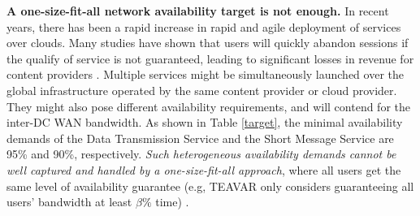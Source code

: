 \documentclass[sigconf]{acmart}
\begin{document}
\textbf{A one-size-fit-all network availability target is not enough.}
In recent years, there has been a rapid increase in rapid and agile deployment of services over clouds.
Many studies have shown that users will quickly abandon sessions if the qualify of service is not guaranteed, leading to significant losses in revenue for content providers \cite{video1,video2,video3}.
Multiple services might be simultaneously launched over the global infrastructure operated by the same content provider or cloud provider. 
They might also pose different availability requirements, and  will contend for the  
inter-DC WAN bandwidth.
As shown in  Table \ref{target}, the minimal availability demands of the Data Transmission Service \cite{alibaba2} and the Short Message Service\cite{alibaba3} are 95\% and 90\%, respectively.
\textit{Such heterogeneous availability demands cannot be well captured and handled by a one-size-fit-all approach}, where all users get the same level of availability guarantee (e.g, TEAVAR  \cite{Teavar} only considers guaranteeing all users' bandwidth at least  $\beta\%$  time) . 
\end{document}
